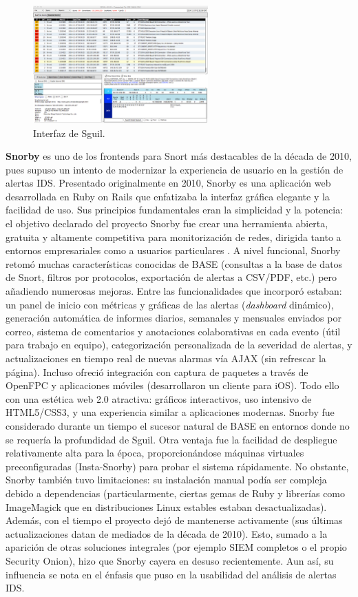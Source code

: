 \documentclass[11pt,a4paper,twoside]{report}
\begin{document}
\begin{figure}[H]
	\centering
	\includegraphics[width=0.6\textwidth]{documento/21.png}
	\caption{Interfaz de Sguil.}
	\label{fig:sguil}
\end{figure}

\textbf{Snorby} es uno de los frontends para Snort más destacables de la década de 2010, pues supuso un intento de modernizar la experiencia de usuario en la gestión de alertas IDS. Presentado originalmente en 2010, Snorby es una aplicación web desarrollada en Ruby on Rails que enfatizaba la interfaz gráfica elegante y la facilidad de uso. Sus principios fundamentales eran la simplicidad y la potencia: el objetivo declarado del proyecto Snorby fue crear una herramienta abierta, gratuita y altamente competitiva para monitorización de redes, dirigida tanto a entornos empresariales como a usuarios particulares \cite{SnorbyHelpnet2010}. A nivel funcional, Snorby retomó muchas características conocidas de BASE (consultas a la base de datos de Snort, filtros por protocolos, exportación de alertas a CSV/PDF, etc.) pero añadiendo numerosas mejoras. Entre las funcionalidades que incorporó estaban: un panel de inicio con métricas y gráficas de las alertas (\textit{dashboard} dinámico), generación automática de informes diarios, semanales y mensuales enviados por correo, sistema de comentarios y anotaciones colaborativas en cada evento (útil para trabajo en equipo), categorización personalizada de la severidad de alertas, y actualizaciones en tiempo real de nuevas alarmas vía AJAX (sin refrescar la página). Incluso ofreció integración con captura de paquetes a través de OpenFPC y aplicaciones móviles (desarrollaron un cliente para iOS). Todo ello con una estética web 2.0 atractiva: gráficos interactivos, uso intensivo de HTML5/CSS3, y una experiencia similar a aplicaciones modernas. Snorby fue considerado durante un tiempo el sucesor natural de BASE en entornos donde no se requería la profundidad de Sguil. Otra ventaja fue la facilidad de despliegue relativamente alta para la época, proporcionándose máquinas virtuales preconfiguradas (Insta-Snorby) para probar el sistema rápidamente. No obstante, Snorby también tuvo limitaciones: su instalación manual podía ser compleja debido a dependencias (particularmente, ciertas gemas de Ruby y librerías como ImageMagick que en distribuciones Linux estables estaban desactualizadas). Además, con el tiempo el proyecto dejó de mantenerse activamente (sus últimas actualizaciones datan de mediados de la década de 2010). Esto, sumado a la aparición de otras soluciones integrales (por ejemplo SIEM completos o el propio Security Onion), hizo que Snorby cayera en desuso recientemente. Aun así, su influencia se nota en el énfasis que puso en la usabilidad del análisis de alertas IDS.
\end{document}
